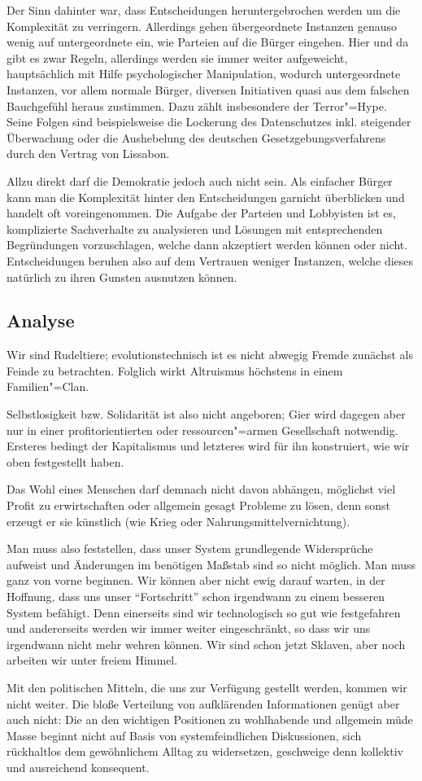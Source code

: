 Der Sinn dahinter war, dass Entscheidungen heruntergebrochen werden um die Komplexität zu verringern. Allerdings gehen übergeordnete Instanzen genauso wenig auf untergeordnete ein, wie Parteien auf die Bürger eingehen. Hier und da gibt es zwar Regeln, allerdings werden sie immer weiter aufgeweicht, hauptsächlich mit Hilfe psychologischer Manipulation, wodurch untergeordnete Instanzen, vor allem normale Bürger, diversen Initiativen quasi aus dem falschen Bauchgefühl heraus zustimmen. Dazu zählt insbesondere der Terror"=Hype. Seine Folgen sind beispielsweise die Lockerung des Datenschutzes inkl. steigender Überwachung oder die Aushebelung des deutschen Gesetzgebungsverfahrens durch den Vertrag von Lissabon.

Allzu direkt darf die Demokratie jedoch auch nicht sein. Als einfacher Bürger kann man die Komplexität hinter den Entscheidungen garnicht überblicken und handelt oft voreingenommen. Die Aufgabe der Parteien und Lobbyisten ist es, komplizierte Sachverhalte zu analysieren und Lösungen mit entsprechenden Begründungen vorzuschlagen, welche dann akzeptiert werden können oder nicht. Entscheidungen beruhen also auf dem Vertrauen weniger Instanzen, welche dieses natürlich zu ihren Gunsten ausnutzen können.

\subsection{Analyse}\label{sec:situation/analysis}

Wir sind Rudeltiere; evolutionstechnisch ist es nicht abwegig Fremde zunächst als Feinde zu betrachten. Folglich wirkt Altruismus höchstens in einem Familien"=Clan.

Selbstlosigkeit bzw. Solidarität ist also nicht angeboren; Gier wird dagegen aber nur in einer profitorientierten oder ressourcen"=armen Gesellschaft notwendig. Ersteres bedingt der Kapitalismus und letzteres wird für ihn konstruiert, wie wir oben festgestellt haben.

Das Wohl eines Menschen darf demnach nicht davon abhängen, möglichst viel Profit zu erwirtschaften oder allgemein gesagt Probleme zu lösen, denn sonst erzeugt er sie künstlich (wie Krieg oder Nahrungsmittelvernichtung).

Man muss also feststellen, dass unser System grundlegende Widersprüche aufweist und Änderungen im benötigen Maßstab sind so nicht möglich. Man muss ganz von vorne beginnen. Wir können aber nicht ewig darauf warten, in der Hoffnung, dass uns unser "`Fortschritt"' schon irgendwann zu einem besseren System befähigt. Denn einerseits sind wir technologisch so gut wie festgefahren und andererseits werden wir immer weiter eingeschränkt, so dass wir uns irgendwann nicht mehr wehren können. Wir sind schon jetzt Sklaven, aber noch arbeiten wir unter freiem Himmel.

Mit den politischen Mitteln, die uns zur Verfügung gestellt werden, kommen wir nicht weiter. Die bloße Verteilung von aufklärenden Informationen genügt aber auch nicht: Die an den wichtigen Positionen zu wohlhabende und allgemein müde Masse beginnt nicht auf Basis von systemfeindlichen Diskussionen, sich rückhaltlos dem gewöhnlichem Alltag zu widersetzen, geschweige denn kollektiv und ausreichend konsequent. 
